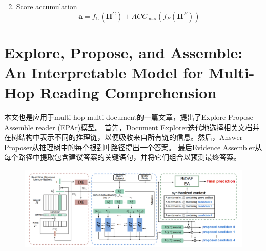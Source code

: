 \documentclass[a4paper,UTF8]{article}
\numberwithin{equation}{section}
\begin{document}
\begin{enumerate}
\begin{equation}
			\end{equation}
	\item Score accumulation\\
	\begin{equation}
		\mathbf{a}=f_{C}\left(\mathbf{H}^{C}\right)+A C C_{\max }\left(f_{E}\left(\mathbf{H}^{E}\right)\right)
		\end{equation}
\end{enumerate}

\newpage
\section{Explore, Propose, and Assemble:
An Interpretable Model for Multi-Hop Reading Comprehension}
本文也是应用于multi-hop multi-document的一篇文章，提出了Explore-Propose-Assemble reader (EPAr)模型。
首先，Document Explorer迭代地选择相关文档并在树结构中表示不同的推理链，以便吸收来自所有链的信息。然后，Answer-Proposer从推理树中的每个根到叶路径提出一个答案。
最后Evidence Assembler从每个路径中提取包含建议答案的关键语句，并将它们组合以预测最终答案。
\begin{figure}[H]
	\centering
	\includegraphics[width=\textwidth]{7-1.png}
\end{figure}
\end{document}
